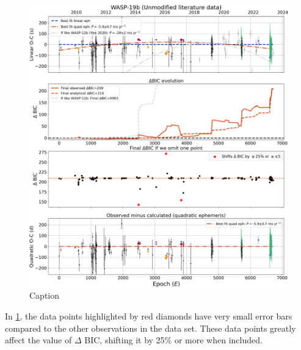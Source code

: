 \documentclass[oneside,12pt]{amsart}
\numberwithin{page}{section}
\begin{document}
\begin{figure}[htbp]
    \centering
    \includegraphics[width=\linewidth]{figs/adams_fig4.jpg}
    \caption{Caption}
    \label{fig:adams-fig4}
\end{figure}

In \ref{fig:adams-fig4}, the data points highlighted by red diamonds have very small error bars compared to the other observations in the data set. These data points greatly affect the value of $\Delta$ BIC, shifting it by 25\% or more when included.
\end{document}
